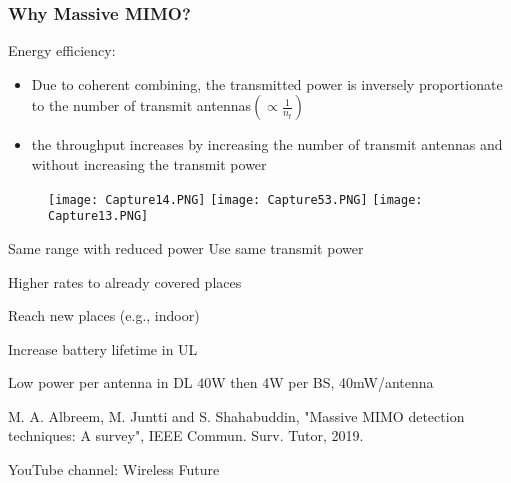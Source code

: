 \documentclass{beamer}
\begin{document}
\begin{frame}[fragile=singleslide]\frametitle{Why Massive MIMO?}
Energy efficiency:
\begin{itemize}
\item Due to coherent combining, the transmitted power is inversely proportionate to the number of transmit antennas$(\propto \frac{1}{n_{t}})$
\item the throughput increases by increasing the number of transmit antennas and without increasing the transmit power
\end{itemize}

\begin{figure}
  \texttt{[image: Capture14.PNG]}
  \texttt{[image: Capture53.PNG]}
  \texttt{[image: Capture13.PNG]}
\end{figure}

\footnotesize Same range with reduced power \;\;\;\;\;\;\;\;\;\;\;\;\;\;\;Use same transmit power

\begin{itemize}
	\begin{minipage}{0.49\linewidth}
        \item \tiny Higher rates to already covered places
        \item \tiny Reach new places (e.g., indoor)
    \end{minipage}
    \begin{minipage}{0.49\linewidth}
        \item \tiny Increase battery lifetime in UL
        \item \tiny Low power per antenna in DL 40W then 4W per BS, 40mW/antenna
   \end{minipage}
\end{itemize}



\tiny M. A. Albreem, M. Juntti and S. Shahabuddin, "Massive MIMO detection techniques: A survey", IEEE Commun. Surv. Tutor, 2019.


\tiny YouTube channel: Wireless Future
\end{frame}
\end{document}
